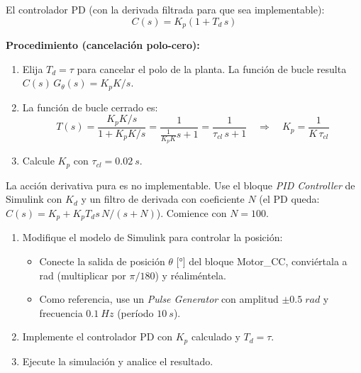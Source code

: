\documentclass[12pt,a4paper]{article}
\begin{document}
El controlador PD (con la derivada filtrada para que sea implementable):
\begin{equation}
  C(s) = K_p\left(1 + T_d\,s\right)
  \label{eq:PD}
\end{equation}

\textbf{Procedimiento (cancelación polo-cero):}
\begin{enumerate}
  \item Elija $T_d = \tau$ para cancelar el polo de la planta.
        La función de bucle resulta $C(s)\,G_\theta(s) = K_p K / s$.
  \item La función de bucle cerrado es:
        \begin{equation}
          T(s) = \frac{K_p K / s}{1 + K_p K / s} = \frac{1}{\frac{1}{K_p K}s+1}
          = \frac{1}{\tau_{cl}\,s+1}
          \quad\Rightarrow\quad
          K_p = \frac{1}{K\,\tau_{cl}}
        \end{equation}
  \item Calcule $K_p$ con $\tau_{cl}=\SI{0.02}{s}$.
\end{enumerate}

\begin{notabox}
  La acción derivativa pura es no implementable. Use el bloque \emph{PID Controller}
  de Simulink con $K_d$ y un filtro de derivada con coeficiente $N$
  (el PD queda: $C(s) = K_p + K_p T_d s\,N/(s+N)$). Comience con $N=100$.
\end{notabox}

\begin{enumerate}
  \item Modifique el modelo de Simulink para controlar la posición:
        \begin{itemize}[noitemsep]
          \item Conecte la salida de posición $\theta$ [°] del bloque Motor\_CC,
                conviértala a rad (multiplicar por $\pi/180$) y réaliméntela.
          \item Como referencia, use un \emph{Pulse Generator} con amplitud
                $\pm 0.5\;\si{rad}$ y frecuencia $\SI{0.1}{Hz}$ (período $\SI{10}{s}$).
        \end{itemize}
  \item Implemente el controlador PD con $K_p$ calculado y $T_d=\tau$.
  \item Ejecute la simulación y analice el resultado.
\end{enumerate}
\end{document}
